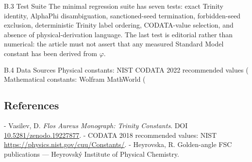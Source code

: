   B.3 Test Suite
  The minimal regression suite has seven tests: exact Trinity identity, AlphaPhi
  disambiguation, sanctioned-seed termination, forbidden-seed exclusion, deterministic
  Trinity label ordering, CODATA-value selection, and absence of physical-derivation
  language. The last test is editorial rather than numerical: the article must not assert
  that any measured Standard Model constant has been derived from $\varphi$.

  B.4 Data Sources
  Physical constants: NIST CODATA 2022 recommended values (                       Mathematical
  constants: Wolfram MathWorld (

\subsection{References}

- Vasilev, D. \textit{Flos Aureus Monograph: Trinity Constants}. DOI \href{https://zenodo.org/doi/10.5281/zenodo.19227877}{10.5281/zenodo.19227877}.
- CODATA 2018 recommended values: NIST \href{https://physics.nist.gov/cuu/Constants/}{https://physics.nist.gov/cuu/Constants/}.
- Heyrovska, R. Golden-angle FSC publications --- Heyrovský Institute of Physical Chemistry.
